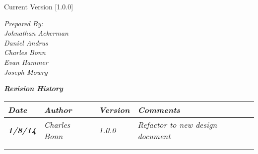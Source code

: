 


Current Version [1.0.0]
\vspace*{5mm}

{\color{SDColor5}
\noindent
\textit{Prepared By:}\\
\textit{Johnathan Ackerman}\\
\textit{Daniel Andrus}\\
\textit{Charles Bonn}\\
\textit{Evan Hammer}\\
\textit{Joseph Mowry}
}

\vfill
\noindent
{\color{SDColor3} \textit{\textbf{Revision History}}}\\
\begin{tabular}{|>{\raggedright}p{1.5cm}|>{\raggedright}p{3cm}|>{\raggedright}p{1.5cm}|>{\raggedright}p{9cm}|}
\hline
\textit{\textbf{Date}} &  \textit{\textbf{Author}} & \textit{\textbf{Version}} & \textit{\textbf{Comments}}\tabularnewline
\hline
 \textit{\textbf{1/8/14}} & \textit{Charles Bonn} & \textit{1.0.0} & \textit{Refactor to new design document}\tabularnewline
\hline
\textit{\textbf{}} & \textit{} & \textit{} & \textit{}\tabularnewline
 &  &  & \tabularnewline
\hline
\end{tabular}
\vfill

